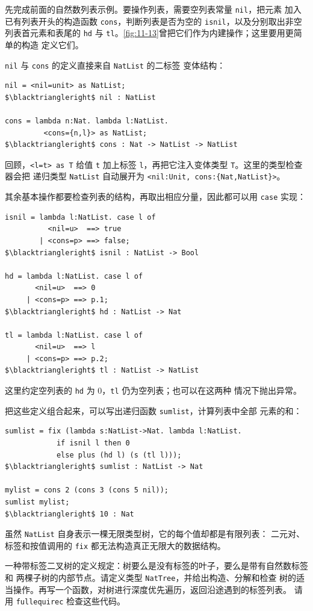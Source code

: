 先完成前面的自然数列表示例。要操作列表，需要空列表常量 \texttt{nil}，把元素
加入已有列表开头的构造函数 \texttt{cons}，判断列表是否为空的
\texttt{isnil}，以及分别取出非空列表首元素和表尾的 \texttt{hd} 与
\texttt{tl}。\cref{fig:11-13}曾把它们作为内建操作；这里要用更简单的构造
定义它们。

\texttt{nil} 与 \texttt{cons} 的定义直接来自 \texttt{NatList} 的二标签
变体结构：
\begin{lstlisting}[mathescape=true]
nil = <nil=unit> as NatList;
$\blacktriangleright$ nil : NatList

cons = lambda n:Nat. lambda l:NatList.
         <cons={n,l}> as NatList;
$\blacktriangleright$ cons : Nat -> NatList -> NatList
\end{lstlisting}
回顾，\texttt{<l=t> as T} 给值 \texttt{t}
加上标签 \texttt{l}，再把它注入变体类型 \texttt{T}。这里的类型检查器会把
递归类型 \texttt{NatList} 自动展开为
\texttt{<nil:Unit, cons:\{Nat,NatList\}>}。

其余基本操作都要检查列表的结构，再取出相应分量，因此都可以用
\texttt{case} 实现：
\begin{lstlisting}[mathescape=true]
isnil = lambda l:NatList. case l of
          <nil=u>  ==> true
        | <cons=p> ==> false;
$\blacktriangleright$ isnil : NatList -> Bool

hd = lambda l:NatList. case l of
       <nil=u>  ==> 0
     | <cons=p> ==> p.1;
$\blacktriangleright$ hd : NatList -> Nat

tl = lambda l:NatList. case l of
       <nil=u>  ==> l
     | <cons=p> ==> p.2;
$\blacktriangleright$ tl : NatList -> NatList
\end{lstlisting}
这里约定空列表的 \texttt{hd} 为 0，\texttt{tl} 仍为空列表；也可以在这两种
情况下抛出异常。

把这些定义组合起来，可以写出递归函数 \texttt{sumlist}，计算列表中全部
元素的和：
\begin{lstlisting}[mathescape=true]
sumlist = fix (lambda s:NatList->Nat. lambda l:NatList.
            if isnil l then 0
            else plus (hd l) (s (tl l)));
$\blacktriangleright$ sumlist : NatList -> Nat

mylist = cons 2 (cons 3 (cons 5 nil));
sumlist mylist;
$\blacktriangleright$ 10 : Nat
\end{lstlisting}
虽然 \texttt{NatList} 自身表示一棵无限类型树，它的每个值却都是有限列表：
二元对、标签和按值调用的 \texttt{fix} 都无法构造真正无限大的数据结构。

\begin{exercise}[\(\star\star\)]
\label{ex:20.1.1}
一种带标签二叉树的定义规定：树要么是没有标签的叶子，要么是带有自然数标签和
两棵子树的内部节点。请定义类型 \texttt{NatTree}，并给出构造、分解和检查
树的适当操作。再写一个函数，对树进行深度优先遍历，返回沿途遇到的标签列表。
请用 \texttt{fullequirec} 检查这些代码。
\end{exercise}

